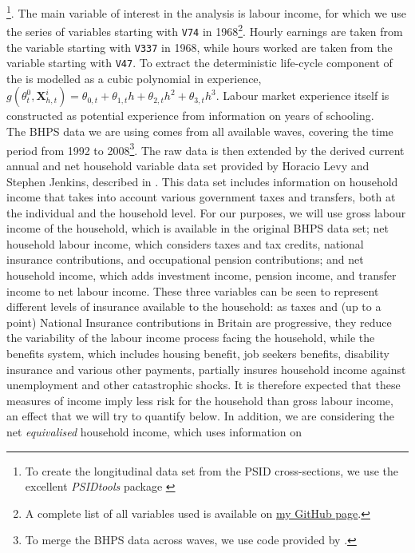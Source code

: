 \footnote{To create the longitudinal data set from the PSID cross-sections, we
use the excellent \textit{PSIDtools} package \citep{Kohler2015}}. The main
variable of interest in the analysis is labour income, for which we use the
series of variables starting with \texttt{V74} in 1968\footnote{A complete list
of all variables used is available on
\href{https://github.com/nilshg/psidJulia/blob/master/create_panel.do}{my GitHub
page}.}. Hourly earnings are taken from the variable starting with \texttt{V337}
in 1968, while hours worked are taken from the variable starting with
\texttt{V47}. To extract the deterministic life-cycle component of the is 
modelled as a cubic polynomial in experience,
$g(\theta_t^0, \pmb{X}_{h,t}^i) = \theta_{0,t} + \theta_{1,t} h 
+ \theta_{2,t} h^2 + \theta_{3,t} h^3$. Labour market experience itself is 
constructed as potential experience from information on years of schooling. 
 \\
The BHPS data we are using comes from all available waves, covering the time 
period from 1992 to 2008\footnote{To merge the BHPS data across waves, we use 
code provided by \citet{Vandendriessche2015}.}. The raw data is then extended by
the derived current annual and net household variable data set provided by 
Horacio Levy and Stephen Jenkins, described in \citet{Jenkins2010}. This data set 
includes information on household income 
that takes into account various government taxes and transfers, both at the 
individual and the household level. For our purposes, we will use gross labour
income of the household, which is available in the original BHPS data set;
net household labour income, which considers taxes and tax credits, national
insurance contributions, and occupational pension contributions; and net 
household income, which adds investment income, pension income, and transfer
income to net labour income. These three variables can be seen to represent 
different levels of insurance available to the household: as taxes and (up to 
a point) National Insurance contributions in Britain are progressive, they reduce
the variability of the labour income process facing the household, while the
benefits system, which includes housing benefit, job seekers benefits, disability
insurance and various other payments, partially insures household income against
unemployment and other catastrophic shocks. It is therefore expected that these
measures of income imply less risk for the household than gross labour income,
an effect that we will try to quantify below. In addition, we are considering
the net \textit{equivalised} household income, which uses information on 

